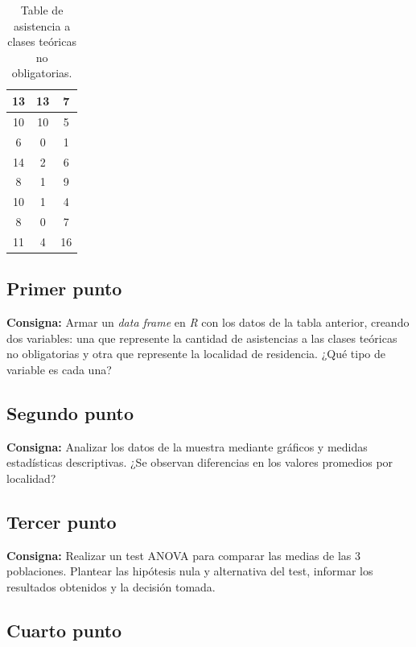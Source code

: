 \documentclass{article} %
\begin{document}
\begin{table}[H]
\begin{tabular}{|| c | c | c ||}
            \hline
            13 & 13 & 7\\
            \hline
            10 & 10 & 5\\
            \hline
            6 & 0 & 1\\
            \hline
            14 & 2 & 6\\
            \hline
            8 & 1 & 9\\
            \hline
            10 & 1 & 4\\
            \hline
            8 & 0 & 7\\
            \hline
            11 & 4 & 16\\
            \hline
			\hline
		\end{tabular}
		\caption{Table de asistencia a clases teóricas no obligatorias.}
	\label{tab:table-x}
\end{table}

\subsection{Primer punto}

\textbf{Consigna:} Armar un \textit{data frame} en \textit{R} con los datos de la tabla anterior, creando dos variables: una que represente la cantidad de asistencias a las clases teóricas no obligatorias y otra que represente la localidad de residencia. ¿Qué tipo de variable es cada una?

\subsection{Segundo punto}

\textbf{Consigna:} Analizar los datos de la muestra mediante gráficos y medidas estadísticas descriptivas. ¿Se observan diferencias en los valores promedios por localidad?

\subsection{Tercer punto}

\textbf{Consigna:} Realizar un test ANOVA para comparar las medias de las 3 poblaciones. Plantear las hipótesis nula y alternativa del test, informar los resultados obtenidos y la decisión tomada.


\subsection{Cuarto punto}
\end{document}
